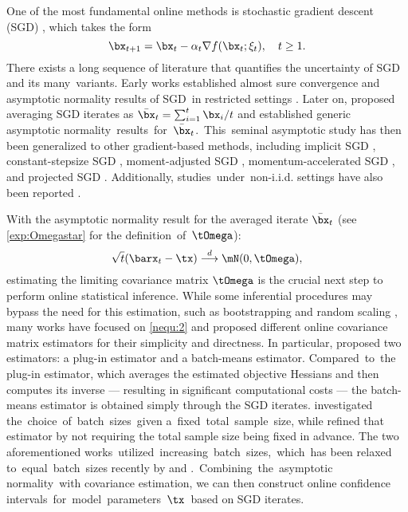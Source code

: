 One of the most fundamental online methods is stochastic gradient descent (SGD) \citep{Robbins1951Stochastic, Kiefer1952Stochastic}, which takes the form
\begin{equation*}
\bx_{t+1} = \bx_t - \alpha_t \nabla f(\bx_t; \xi_t),\quad t\geq 1.
\end{equation*}
There exists a long sequence of literature that quantifies the uncertainty of SGD and its many~variants. Early works established almost sure convergence and asymptotic normality results of SGD~in restricted settings \citep{Sacks1958Asymptotic, Fabian1968Asymptotic, Robbins1971convergence, Fabian1973Asymptotically, Ljung1977Analysis, Ermoliev1983Stochastic, Lai2003Stochastic}. Later on, \cite{Ruppert1988Efficient, Polyak1992Acceleration} proposed averaging SGD iterates as $\bar{\bx}_t =\sum_{i=1}^{t}\bx_i/t$ and established generic asymptotic normality~results~for~$\bar{\bx}_t$.~This~seminal asymptotic study has then been generalized to other gradient-based methods, including implicit SGD \citep{Toulis2014Statistical, Toulis2017Asymptotic}, constant-stepsize SGD \citep{Li2018Statistical, Mou2020Linear}, moment-adjusted SGD \citep{Liang2019Statistical}, momentum-accelerated SGD \citep{Tang2023Acceleration}, and projected SGD \citep{Duchi2021Asymptotic, Davis2024Asymptotic}. Additionally, studies~under~non-i.i.d. settings have also been reported \citep{Chen2020Statisticala, Liu2023Online, Li2023statistical}. 


With the asymptotic normality result for the averaged iterate $\bar{\bx}_t$ (see \eqref{exp:Omegastar} for the definition~of~$\tOmega$):
\begin{equation}\label{nequ:2}
\sqrt{t}(\barx_t - \tx) \stackrel{d}{\longrightarrow} \mN(0, \tOmega),
\end{equation}
estimating the limiting covariance matrix $\tOmega$ is the crucial next step to perform online statistical inference. While some inferential procedures may bypass the need for this estimation, such as bootstrapping \citep{Fang2018Online, Liu2023Statistical, Zhong2023Online, Lam2023Resampling} and random scaling \citep{Li2021Statistical, Lee2022Fast}, many works have focused on \eqref{nequ:2} and proposed different online covariance matrix estimators for their simplicity and directness. 
In particular, \cite{Chen2020Statistical} proposed two estimators: a plug-in estimator and a batch-means estimator. \mbox{Compared}~to~the plug-in estimator, which averages the estimated objective Hessians and then computes its inverse --- resulting in significant computational costs --- the batch-means estimator is obtained simply through the SGD iterates. \cite{Chen2020Statistical} investigated the~choice~of~batch~sizes~given a~fixed~\mbox{total}~\mbox{sample}~size, while \cite{Zhu2021Online} refined that estimator by not requiring the total sample size being fixed in advance. The two aforementioned works~utilized~increasing~batch~sizes,~which~has been \mbox{relaxed} to~equal~batch~sizes recently by \cite{Zhu2021Constructing} and \cite{Singh2023Utility}.~Combining~the~asymptotic normality~with covariance estimation, we can then construct online confidence intervals~for~model~parameters~$\tx$~based on SGD iterates.


